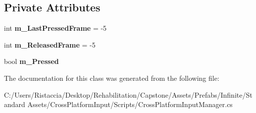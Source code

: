 \subsection*{Private Attributes}
\begin{DoxyCompactItemize}
\item 
\mbox{\label{class_unity_standard_assets_1_1_cross_platform_input_1_1_cross_platform_input_manager_1_1_virtual_button_ae0c157d232863ceaa1ac13ae64e0af10}} 
int {\bfseries m\+\_\+\+Last\+Pressed\+Frame} = -\/5
\item 
\mbox{\label{class_unity_standard_assets_1_1_cross_platform_input_1_1_cross_platform_input_manager_1_1_virtual_button_a755fdc6155fb67b7b9c9649f474ed5fd}} 
int {\bfseries m\+\_\+\+Released\+Frame} = -\/5
\item 
\mbox{\label{class_unity_standard_assets_1_1_cross_platform_input_1_1_cross_platform_input_manager_1_1_virtual_button_aa1f41b51baf82dfda4ee4b5bfe273001}} 
bool {\bfseries m\+\_\+\+Pressed}
\end{DoxyCompactItemize}


The documentation for this class was generated from the following file\+:\begin{DoxyCompactItemize}
\item 
C\+:/\+Users/\+Ristaccia/\+Desktop/\+Rehabilitation/\+Capstone/\+Assets/\+Prefabs/\+Infinite/\+Standard Assets/\+Cross\+Platform\+Input/\+Scripts/Cross\+Platform\+Input\+Manager.\+cs\end{DoxyCompactItemize}

